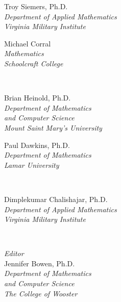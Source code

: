 
\begingroup

\newlength{\cellwidth}

%
\parbox[t]{\cellwidth}{Troy Siemers, Ph.D.\\\small
\emph{Department of Applied Mathematics}\\
\emph{Virginia Military Institute}}
\parbox[t]{\cellwidth}{Michael Corral\\\small
\emph{Mathematics}\\
\emph{Schoolcraft College}}
\\[\baselineskip]
\parbox[t]{\cellwidth}{Brian Heinold, Ph.D.\\\small
\emph{Department of Mathematics}\\
\emph{and Computer Science}\\
\emph{Mount Saint Mary's University}}
\parbox[t]{\cellwidth}{Paul Dawkins, Ph.D.\\\small
\emph{Department of Mathematics}\\
\emph{Lamar University}}
\\[\baselineskip]
\parbox[t]{\cellwidth}{Dimplekumar Chalishajar, Ph.D.\\\small
\emph{Department of Applied Mathematics}\\
\emph{Virginia Military Institute}}
\\[2\baselineskip]
\parbox[t]{\cellwidth}{\emph{Editor}\\
Jennifer Bowen, Ph.D.\\\small
\emph{Department of Mathematics}\\
\emph{and Computer Science}\\
\emph{The College of Wooster}}

\vspace{1in}

